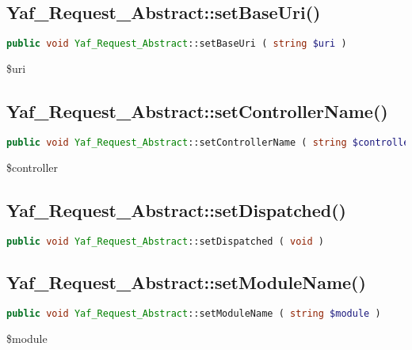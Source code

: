 \subsection{Yaf\_Request\_Abstract::setBaseUri()}

\begin{lstlisting}[language=PHP]
public void Yaf_Request_Abstract::setBaseUri ( string $uri )
\end{lstlisting}

\begin{compactitem}
\item \$uri
\end{compactitem}

\subsection{Yaf\_Request\_Abstract::setControllerName()}

\begin{lstlisting}[language=PHP]
public void Yaf_Request_Abstract::setControllerName ( string $controller )
\end{lstlisting}

\begin{compactitem}
\item \$controller
\end{compactitem}

\subsection{Yaf\_Request\_Abstract::setDispatched()}

\begin{lstlisting}[language=PHP]
public void Yaf_Request_Abstract::setDispatched ( void )
\end{lstlisting}


\subsection{Yaf\_Request\_Abstract::setModuleName()}


\begin{lstlisting}[language=PHP]
public void Yaf_Request_Abstract::setModuleName ( string $module )
\end{lstlisting}

\begin{compactitem}
\item \$module
\end{compactitem}




